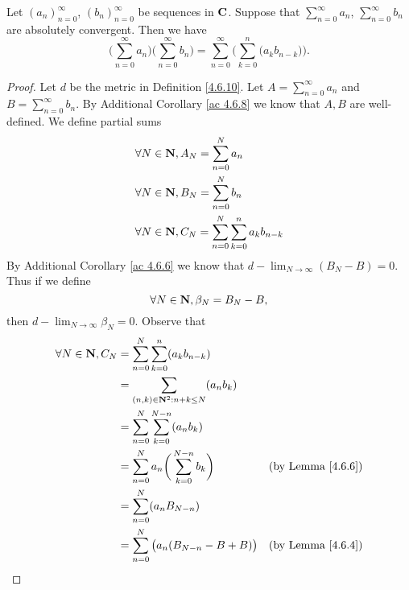 \begin{additional corollary}\label{ac 4.6.9}
Let \((a_n)_{n = 0}^\infty\), \((b_n)_{n = 0}^\infty\) be sequences in \(\mathbf{C}\).
Suppose that \(\sum_{n = 0}^\infty a_n\), \(\sum_{n = 0}^\infty b_n\) are absolutely convergent.
Then we have
\[
    \bigg(\sum_{n = 0}^\infty a_n\bigg) \bigg(\sum_{n = 0}^\infty b_n\bigg) = \sum_{n = 0}^\infty \bigg(\sum_{k = 0}^n \big(a_k b_{n - k}\big)\bigg).
\]
\end{additional corollary}

\begin{proof}
    Let \(d\) be the metric in Definition \ref{4.6.10}.
    Let \(A = \sum_{n = 0}^\infty a_n\) and \(B = \sum_{n = 0}^\infty b_n\).
    By Additional Corollary \ref{ac 4.6.8} we know that \(A, B\) are well-defined.
    We define partial sums
    \begin{align*}
         & \forall N \in \mathbf{N}, A_N = \sum_{n = 0}^N a_n                          \\
         & \forall N \in \mathbf{N}, B_N = \sum_{n = 0}^N b_n                          \\
         & \forall N \in \mathbf{N}, C_N = \sum_{n = 0}^N \sum_{k = 0}^n a_k b_{n - k}
    \end{align*}
    By Additional Corollary \ref{ac 4.6.6} we know that \(d - \lim_{N \to \infty} (B_N - B) = 0\).
    Thus if we define
    \[
        \forall N \in \mathbf{N}, \beta_N = B_N - B,
    \]
    then \(d - \lim_{N \to \infty} \beta_N = 0\).
    Observe that
    \begin{align*}
        \forall N \in \N, C_N & = \sum_{n = 0}^N \sum_{k = 0}^n (a_k b_{n - k})                                                         \\
                              & = \sum_{(n, k) \in \N^2 : n + k \leq N} (a_n b_k)                                                       \\
                              & = \sum_{n = 0}^N \sum_{k = 0}^{N - n} (a_n b_k)                                                         \\
                              & = \sum_{n = 0}^N a_n \bigg(\sum_{k = 0}^{N - n} b_k\bigg)               & \text{(by Lemma \ref{4.6.6})} \\
                              & = \sum_{n = 0}^N (a_n B_{N - n})                                                                        \\
                              & = \sum_{n = 0}^N \big(a_n (B_{N - n} - B + B)\big)                      & \text{(by Lemma \ref{4.6.4})} \\

\end{align*}
\end{proof}
